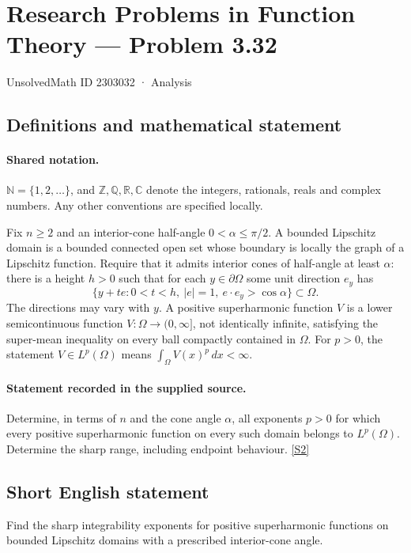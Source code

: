 \documentclass[11pt]{book}
\newcommand{\sref}[2]{\hyperlink{source:#1:#2}{[S#2]}}
\begin{document}
\setcounter{section}{2303031}
\section{Research Problems in Function Theory — Problem 3.32}\label{2303032}
{\small\sffamily UnsolvedMath ID 2303032 · Analysis}
\subsection{Definitions and mathematical statement}

\paragraph{Shared notation.}$\mathbb N=\{1,2,\ldots\}$, and $\mathbb Z,\mathbb Q,\mathbb R,\mathbb C$ denote the integers, rationals, reals and complex numbers. Any other conventions are specified locally.


Fix $n\ge2$ and an interior-cone half-angle $0<\alpha\le\pi/2$. A bounded Lipschitz domain is a bounded connected open set whose boundary is locally the graph of a Lipschitz function. Require that it admits interior cones of half-angle at least $\alpha$: there is a height $h>0$ such that for each $y\in\partial\Omega$ some unit direction $e_y$ has
\[\{y+te:0<t<h,\ |e|=1,\ e\cdot e_y>\cos\alpha\}\subset\Omega.
\]
The directions may vary with $y$. A positive superharmonic function $V$ is a lower semicontinuous function $V:\Omega\to(0,\infty]$, not identically infinite, satisfying the super-mean inequality on every ball compactly contained in $\Omega$. For $p>0$, the statement $V\in L^p(\Omega)$ means $\int_\Omega V(x)^p\,dx<\infty$.
\paragraph{Statement recorded in the supplied source.}
Determine, in terms of $n$ and the cone angle $\alpha$, all exponents $p>0$ for which every positive superharmonic function on every such domain belongs to $L^p(\Omega)$. Determine the sharp range, including endpoint behaviour. \sref{2303032}{2}
\subsection{Short English statement}
Find the sharp integrability exponents for positive superharmonic functions on bounded Lipschitz domains with a prescribed interior-cone angle.
\end{document}
